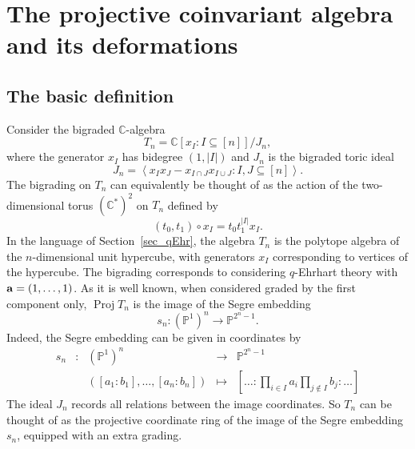 \documentclass[a4paper,11pt]{amsart}
\theoremstyle{plain}
\theoremstyle{definition}
\newcommand{\C}{\mathbb{C}}
\newcommand{\pa}{T} %
\renewcommand{\P}{\mathbb{P}}
\newcommand{\Z}{\mathbb{Z}}
\DeclareMathOperator{\Proj}{Proj}
\newcommand{\ba}{{\bf a}}
\begin{document}

\section{The projective coinvariant algebra and its deformations}
\subsection{The basic definition}\label{section:basic_def}  Consider the bigraded $\C$-algebra
\[ \pa_n = \C[x_{\scriptscriptstyle I}\colon I\subseteq[n]]/ J_n, 
\]
where the generator $x_{\scriptscriptstyle I}$ has bidegree $(1,|I|)$ and $J_n$ is the bigraded toric ideal 
\[
J_n=\left\langle x_{\scriptscriptstyle I}x_{\scriptscriptstyle J}-x_{\scriptscriptstyle I\cap J}x_{\scriptscriptstyle I\cup J}\colon I,J\subseteq[n]\right\rangle. 
\]
The bigrading on $\pa_n$ can equivalently be thought of as the action of the two-dimensional torus $(\C^*)^2$ on $\pa_n$ defined by 
\[
 (t_0, t_1) \circ x_{\scriptscriptstyle I} =  t_0 t_1^{|I|} x_{\scriptscriptstyle I}. 
\]
In the language of Section~\ref{sec_qEhr}, the algebra $\pa_n$ is the polytope algebra of the $n$-dimensional unit hypercube, with generators $x_{\scriptscriptstyle I}$ corresponding to 
vertices of the hypercube. The bigrading corresponds to considering $q$-Ehrhart theory with $\ba=(1,\ldots, 1)$. As it is well known, when considered graded by the first component only, $\Proj\pa_n$ is the image of the Segre embedding
\[s_n\colon (\P^1)^n\rightarrow \P^{2^n-1}.\]
Indeed, the Segre embedding can be given in coordinates by 
\[\begin{array}{rcccc}
s_n& \colon &  (\P^1)^n & \rightarrow &  \P^{2^n-1}\\
&& \left([a_1:b_1], \ldots, [a_n:b_n] \right)& \mapsto & \left[\ldots\colon \prod_{i\in I} a_i\prod_{j\not\in I}b_j : \ldots\right]
\end{array}\]
The ideal $J_n$ records all relations between the image coordinates. So $\pa_n$ can be thought of as the projective coordinate ring of the image of the Segre embedding~$s_n$, equipped with an extra grading. 
\end{document}
